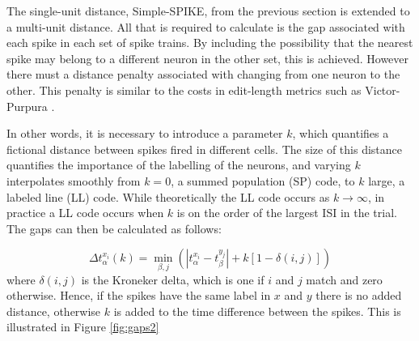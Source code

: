 The single-unit distance, Simple-SPIKE, from the previous section is extended to a multi-unit distance. All that is required to calculate is the gap associated with each spike in each set of spike trains. By including the possibility that the nearest spike may belong to a different neuron in the other set, this is achieved. However there must a distance penalty associated with changing from one neuron to the other. This penalty is similar to the costs in edit-length metrics such as Victor-Purpura \citep{VictorPurpura1997a}. 

In other words, it is necessary to introduce a parameter $k$, which quantifies a fictional distance between spikes fired in different cells.  The size of this distance quantifies the importance of the labelling of the neurons, and varying $k$ interpolates smoothly from $k=0$, a summed population (SP) code, to $k$ large, a labeled line  (LL) code.  While theoretically the LL code occurs as $k \rightarrow \infty$, in practice a LL code occurs when $k$ is on the order of the largest ISI in the trial.   The gaps can then be calculated as follows:

\begin{equation}\label{initspike}
\Delta t_{\alpha}^{x_i}(k) = \min_{\beta,j} \left( |t_{\alpha}^{x_i} - t_{\beta}^{y_j} | + k\left[1-\delta(i,j)\right] \right)
\end{equation}
where $\delta(i,j)$ is the Kroneker delta, which is one if $i$ and $j$ match and zero otherwise. Hence, if the spikes have the same label in $x$ and $y$ there is no added distance, otherwise $k$ is added to the time difference between the spikes.  This is illustrated in Figure \ref{fig:gaps2}

